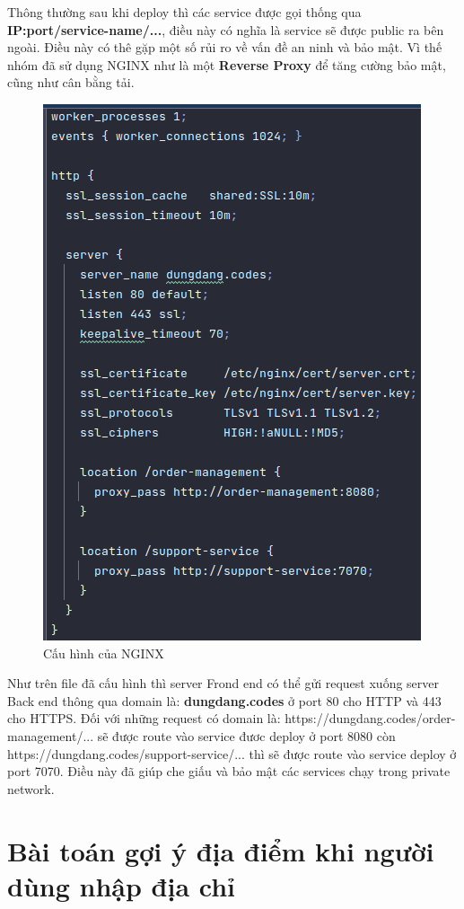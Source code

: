 	  Thông thường sau khi deploy thì các service được gọi thống qua \textbf{IP:port/service-name/...}, điều này có nghĩa là service sẽ được public ra bên ngoài. Điều này có thê gặp một số rủi ro về vấn đề an ninh và bảo mật. Vì thế nhóm đã sử dụng NGINX như là một \textbf{Reverse Proxy} để tăng cường bảo mật, cũng như cân bằng tải.\\ 
	  
	  
	  \begin{figure}[H]
	  	\centering
	  	\includegraphics[width=0.7\linewidth]{Images/NGINXconfig}
	  	\linebreak
	  	\caption{Cấu hình của NGINX}
	  \end{figure}
  	
		Như trên file đã cấu hình thì server Frond end có thể gửi request xuống server Back end thông qua domain là: \textbf{dungdang.codes} ở port 80 cho HTTP và 443 cho HTTPS. Đối với những request có domain là: https://dungdang.codes/order-management/... sẽ được route vào service đươc deploy ở port 8080 còn https://dungdang.codes/support-service/... thì sẽ được route vào service deploy ở port 7070. Điều này đã giúp che giấu và bảo mật các services chạy trong private network.
		
		  \section{Bài toán gợi ý địa điểm khi người dùng nhập địa chỉ}
		  

